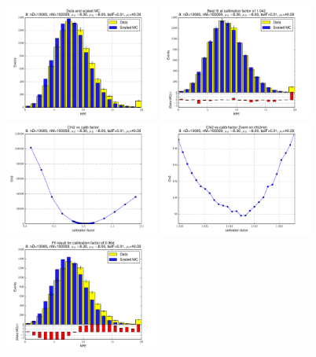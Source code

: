 
 \begin{figure}[htbp] \begin{center} 
\includegraphics[width=0.45\textwidth]{../FIGURES/08/FIG_Data_and_scaled_MC.pdf} 
\includegraphics[width=0.45\textwidth]{../FIGURES/08/FIG_Best_fit_at_calibration_factor_of_1_042.pdf} 
\includegraphics[width=0.45\textwidth]{../FIGURES/08/FIG_Chi2_vs_calib_factor.pdf} 
\includegraphics[width=0.45\textwidth]{../FIGURES/08/FIG_Chi2_vs_calib_factor_Zoom_on_chi2min.pdf} 
\includegraphics[width=0.45\textwidth]{../FIGURES/08/FIG_Fit_result_for_calibration_factor_of_0_964.pdf} 

\end{center}
\end{figure}
